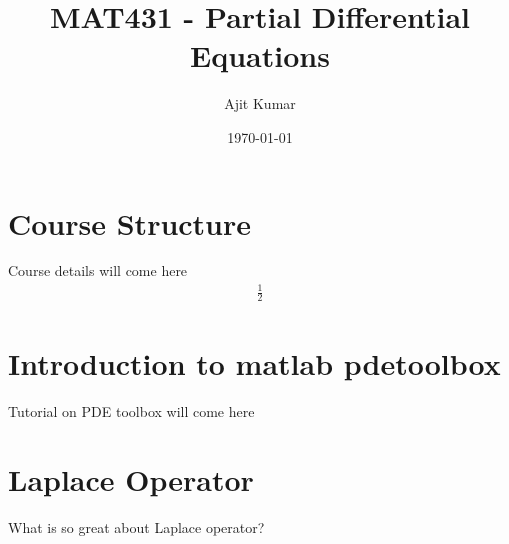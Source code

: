 \documentclass[11pt]{article}
\author{Ajit Kumar}
\date{\today}
\title{MAT431 - Partial Differential Equations}
\begin{document}
\maketitle
\tableofcontents


\section{Course Structure}
\label{sec-1}

Course details will come here
\begin{align*}
\frac{1}{2}
\end{align*}



\section{Introduction to matlab pdetoolbox}
\label{sec-2}

Tutorial on PDE toolbox will come here


\section{Laplace Operator}
\label{sec-3}

What is so great about Laplace operator?
\end{document}
